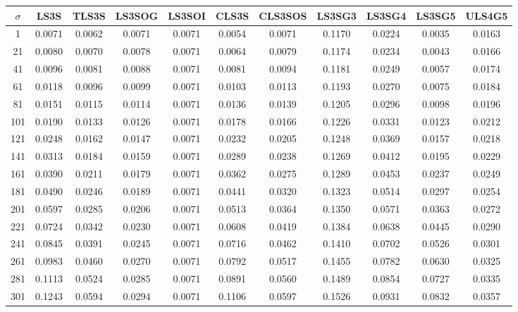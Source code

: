 \begin{table}[ht!]
\centering
\begin{tabular}{c|c|c|c|c|c|c|c|c|c|c}
$\sigma$ & \scriptsize{LS3S} & \scriptsize{TLS3S} & \scriptsize{LS3SOG} & \scriptsize{LS3SOI} & \scriptsize{CLS3S} & \scriptsize{CLS3SOS} & \scriptsize{LS3SG3} & \scriptsize{LS3SG4} & \scriptsize{LS3SG5} & \scriptsize{ULS4G5}\\ \hline 
1 & 0.0071 & 0.0062 & 0.0071 & 0.0071 & 0.0054 & 0.0071 & 0.1170 & 0.0224 & 0.0035 & 0.0163 \\ \hline
21 & 0.0080 & 0.0070 & 0.0078 & 0.0071 & 0.0064 & 0.0079 & 0.1174 & 0.0234 & 0.0043 & 0.0166 \\ \hline
41 & 0.0096 & 0.0081 & 0.0088 & 0.0071 & 0.0081 & 0.0094 & 0.1181 & 0.0249 & 0.0057 & 0.0174 \\ \hline
61 & 0.0118 & 0.0096 & 0.0099 & 0.0071 & 0.0103 & 0.0113 & 0.1193 & 0.0270 & 0.0075 & 0.0184 \\ \hline
81 & 0.0151 & 0.0115 & 0.0114 & 0.0071 & 0.0136 & 0.0139 & 0.1205 & 0.0296 & 0.0098 & 0.0196 \\ \hline
101 & 0.0190 & 0.0133 & 0.0126 & 0.0071 & 0.0178 & 0.0166 & 0.1226 & 0.0331 & 0.0123 & 0.0212 \\ \hline
121 & 0.0248 & 0.0162 & 0.0147 & 0.0071 & 0.0232 & 0.0205 & 0.1248 & 0.0369 & 0.0157 & 0.0218 \\ \hline
141 & 0.0313 & 0.0184 & 0.0159 & 0.0071 & 0.0289 & 0.0238 & 0.1269 & 0.0412 & 0.0195 & 0.0229 \\ \hline
161 & 0.0390 & 0.0211 & 0.0179 & 0.0071 & 0.0362 & 0.0275 & 0.1289 & 0.0453 & 0.0237 & 0.0249 \\ \hline
181 & 0.0490 & 0.0246 & 0.0189 & 0.0071 & 0.0441 & 0.0320 & 0.1323 & 0.0514 & 0.0297 & 0.0254 \\ \hline
201 & 0.0597 & 0.0285 & 0.0206 & 0.0071 & 0.0513 & 0.0364 & 0.1350 & 0.0571 & 0.0363 & 0.0272 \\ \hline
221 & 0.0724 & 0.0342 & 0.0230 & 0.0071 & 0.0608 & 0.0419 & 0.1384 & 0.0638 & 0.0445 & 0.0290 \\ \hline
241 & 0.0845 & 0.0391 & 0.0245 & 0.0071 & 0.0716 & 0.0462 & 0.1410 & 0.0702 & 0.0526 & 0.0301 \\ \hline
261 & 0.0983 & 0.0460 & 0.0270 & 0.0071 & 0.0792 & 0.0517 & 0.1455 & 0.0782 & 0.0630 & 0.0325 \\ \hline
281 & 0.1113 & 0.0524 & 0.0285 & 0.0071 & 0.0891 & 0.0560 & 0.1489 & 0.0854 & 0.0727 & 0.0335 \\ \hline
301 & 0.1243 & 0.0594 & 0.0294 & 0.0071 & 0.1106 & 0.0597 & 0.1526 & 0.0931 & 0.0832 & 0.0357 \\ \hline

\end{tabular}
\end{table}
